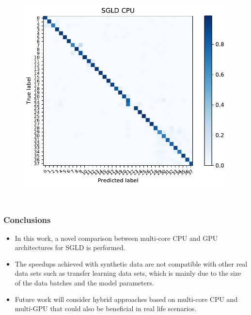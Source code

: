 \documentclass[10pt,a4paper]{beamer}
\begin{document}
\begin{frame}
\begin{columns}[T]
\begin{figure}
		\includegraphics[width=\textwidth]{results/plants_confusion_matrix_sgld_cpu}
		\label{fig:sgld_gpu_performance}
	\end{figure}
\end{columns}
\end{frame}


\begin{frame}\frametitle{Conclusions}
\begin{itemize}
	\item In this work, a novel comparison between multi-core CPU and GPU architectures for SGLD is performed. 
	\item  The speedups achieved with synthetic data are not compatible with other real data sets such as transfer learning data sets, which is mainly due to the size of the data batches and the model parameters. 
	\item Future work will consider hybrid approaches based on multi-core CPU and multi-GPU that could also be beneficial in real life scenarios. 
\end{itemize}
\end{frame}
\end{document}
